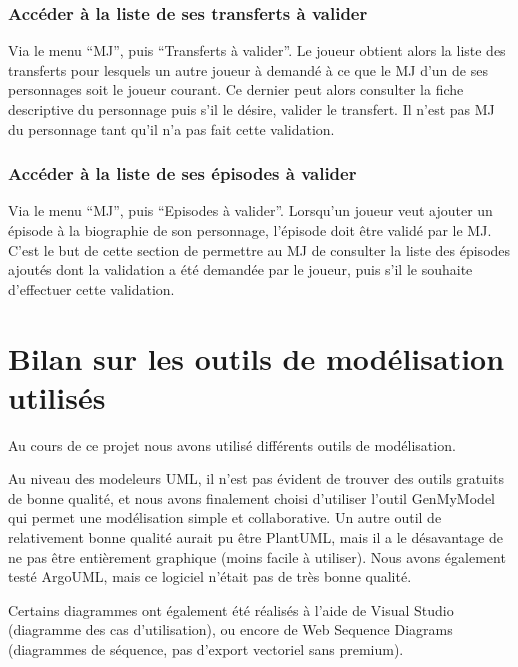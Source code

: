 \documentclass[a4paper, 11pt, titlepage]{article}
\begin{document}
\subsubsection {Accéder à la liste de ses transferts à valider}

Via le menu “MJ”, puis “Transferts à valider”. Le joueur obtient alors la liste des transferts pour lesquels un autre joueur à demandé à ce que le MJ d’un de ses personnages soit le joueur courant. Ce dernier peut alors consulter la fiche descriptive du personnage puis s’il le désire, valider le transfert. Il n’est pas MJ du personnage tant qu’il n’a pas fait cette validation.

\subsubsection {Accéder à la liste de ses épisodes à valider}

Via le menu “MJ”, puis “Episodes à valider”. Lorsqu'un joueur veut ajouter un épisode à la biographie de son personnage, l’épisode doit être validé par le MJ. C’est le but de cette section de permettre au MJ de consulter la liste des épisodes ajoutés dont la validation a été demandée par le joueur, puis s’il le souhaite d’effectuer cette validation.




\section {Bilan sur les outils de modélisation utilisés}

Au cours de ce projet nous avons utilisé différents outils de modélisation.

Au niveau des modeleurs UML, il n'est pas évident de trouver des outils gratuits de bonne qualité, et nous avons finalement choisi d'utiliser l'outil GenMyModel qui permet une modélisation simple et collaborative. Un autre outil de relativement bonne qualité aurait pu être PlantUML, mais il a le désavantage de ne pas être entièrement graphique (moins facile à utiliser). Nous avons également testé ArgoUML, mais ce logiciel n'était pas de très bonne qualité.

Certains diagrammes ont également été réalisés à l'aide de Visual Studio (diagramme des cas d'utilisation), ou encore de Web Sequence Diagrams (diagrammes de séquence, pas d'export vectoriel sans premium).
\end{document}
